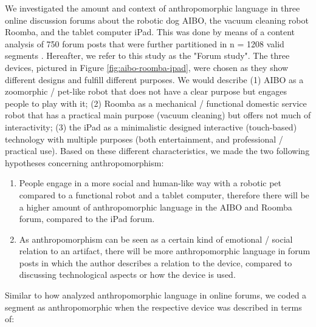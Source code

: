 \documentclass{frontiersSCNS} %
\begin{document}
We investigated the amount and context of anthropomorphic language in three
online discussion forums about the robotic dog AIBO, the vacuum cleaning robot
Roomba, and the tablet computer iPad. This was done by means of a content
analysis of 750 forum posts that were further partitioned in n = 1208 valid
segments \citep{fink_anthropomorphic_2012}. Hereafter, we refer to this study as
the "Forum study". The three devices, pictured in Figure
\ref{fig:aibo-roomba-ipad}, were chosen as they show different designs and
fulfill different purposes. We would describe (1) AIBO as a zoomorphic /
pet-like robot that does not have a clear purpose but engages people to play
with it; (2) Roomba as a mechanical / functional domestic service robot that has
a practical main purpose (vacuum cleaning) but offers not much of interactivity;
(3) the iPad as a minimalistic designed interactive (touch-based) technology
with multiple purposes (both entertainment, and professional / practical use).
Based on these different characteristics, we made the two following hypotheses
concerning anthropomorphism:

\begin{enumerate}

    	\item People engage in a more social and human-like way with a robotic pet compared to a functional robot and a tablet computer, therefore there will be a higher amount of anthropomorphic language in the AIBO and Roomba forum, compared to the iPad forum.

    	\item As anthropomorphism can be seen as a certain kind of emotional / social relation to an artifact, there will be more anthropomorphic language in forum posts in which the author describes a relation to the device, compared to discussing technological aspects or how the device is used.
\end{enumerate}

Similar to how \cite{friedman_hardware_2003} analyzed anthropomorphic language
in online forums, we coded a segment as anthropomorphic when the respective
device was described in terms of:
\end{document}
